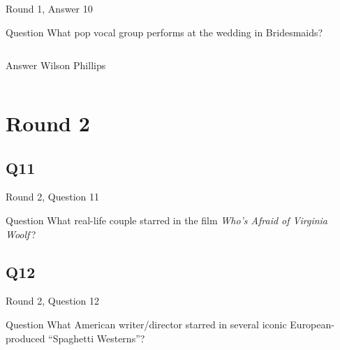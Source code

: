 \documentclass[11pt]{beamer}
\begin{document}
\begin{frame}[t]{Round 1, Answer 10}
  \vspace{2em}
  \begin{block}{Question}
    What pop vocal group performs at the wedding in Bridesmaids?
  \end{block}
  \pause{}
  \begin{columns}[T,totalwidth=\linewidth]
    \begin{column}{0.35\linewidth}
      \begin{block}{Answer}
        Wilson Phillips
      \end{block}
    \end{column}
    \begin{column}{0.6\linewidth}
      \begin{center}
        \texttt{[image: \{Images/wilsonphillips]}.jpg}
      \end{center}
    \end{column}
  \end{columns}
\end{frame}


\section{Round 2}


\subsection*{Q11}
\begin{frame}[t]{Round 2, Question 11}
  \vspace{2em}
  \begin{block}{Question}
    What real-life couple starred in the film \emph{Who's Afraid of Virginia Woolf}\,?
  \end{block}
\end{frame}


\subsection*{Q12}
\begin{frame}[t]{Round 2, Question 12}
  \vspace{2em}
  \begin{block}{Question}
    What American writer/director starred in several iconic European-produced ``Spaghetti Westerns''?
  \end{block}
\end{frame}
\end{document}
